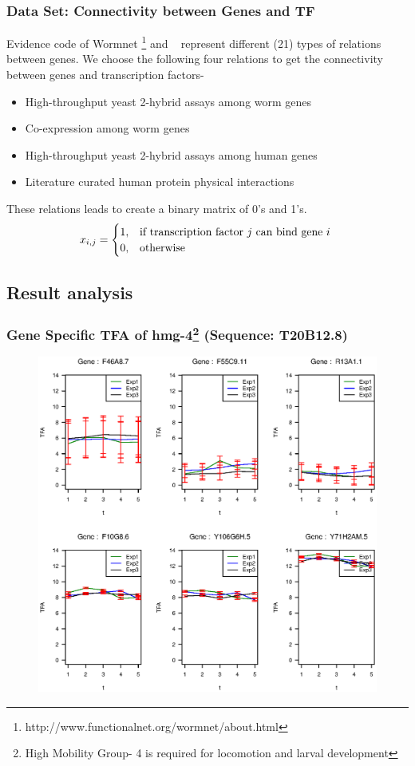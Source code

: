 \documentclass{beamer}
\begin{document}
\begin{frame}
\frametitle{Data Set: Connectivity between Genes and TF}
Evidence code of Wormnet \footnote{http://www.functionalnet.org/wormnet/about.html} and ~\cite{p5} represent {\color{blue} different (21) types of relations} between genes.
We choose the following four relations to get the connectivity between genes and transcription factors-
\begin{itemize}
	  \item High-throughput yeast 2-hybrid assays among worm genes
	  \item Co-expression among worm genes
	  \item High-throughput yeast 2-hybrid assays among human genes
	  \item Literature curated human protein physical interactions 
\end{itemize} 

These relations leads to create a {\color{red} binary matrix} of {\color{blue} 0}'s and {\color{blue} 1}'s. 
\[
    x_{i,j}= 
\begin{cases}
    1,& \text{if } $\text {transcription factor $j$ can bind gene $i$ }$\\
    0,              & \text{otherwise}
\end{cases}
\] 
\end{frame}


\subsection{Result analysis}
\begin{frame}
\frametitle{Gene Specific TFA of {\color{red} hmg-4}{\footnote{High Mobility Group- 4 is required for locomotion and larval development}} (Sequence: T20B12.8)} %
\begin{figure}
\includegraphics[width=0.65\linewidth]{diagrams/T20B12_8_3.eps}
\end{figure}
\end{frame}
\end{document}
